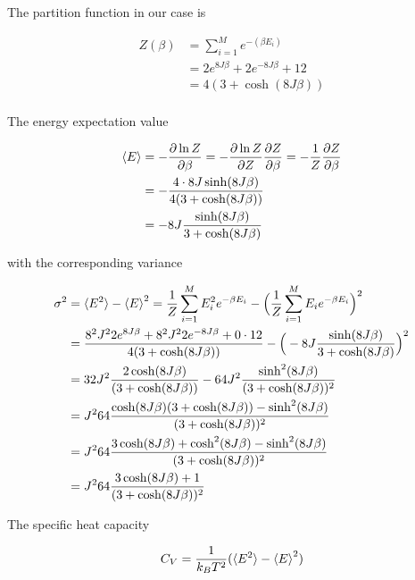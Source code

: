 \documentclass[11pt]{article}
\begin{document}
\begin{flushleft}

The partition function in our case is

\begin{align*}
Z(\beta) &= \sum_{i=1}^M e^{-(\beta E_i)}\\
&= 2 e^{8J \beta} + 2 e^{-8J \beta} + 12\\
&= 4(3 + \cosh (8 J \beta))\\
\end{align*}


The energy expectation value

\begin{align*}
\braket{E} & = - \frac{\partial \ln Z}{\partial \beta}= - \frac{\partial \ln Z}{\partial Z} \frac{\partial Z}{\partial \beta} = - \frac{1}{Z} \frac{\partial Z}{\partial \beta}\\
& = - \frac{4 \cdot 8J \sinh(8J \beta)}{4(3 + \cosh (8 J \beta))}\\
&= - 8J \frac{\sinh(8J \beta)}{3 + \cosh(8J \beta)}  
\end{align*}

with the corresponding variance

\begin{align*}
\sigma^2 &= \braket{E^2} - \braket{E}^2 = \frac{1}{Z} \sum_{i=1}^M E_i^2 e^{- \beta E_i} - \Big(
\frac{1}{Z} \sum_{i=1}^M E_i e^{- \beta E_i} 
\Big)^2\\
 &= \frac{8^2 J^2  2 e^{8J \beta} + 8^2 J^2 2 e^{-8J \beta} + 0 \cdot 12}{ 4(3 + \cosh (8 J \beta))}
- \Big(  - 8J \frac{\sinh(8J \beta)}{3 + \cosh(8J \beta)}  \Big)^2\\
&= 32J^2 \frac{ 2 \cosh (8J \beta)}{ (3 + \cosh (8 J \beta))}
- 64 J^2 \frac{\sinh^2(8J \beta)}{(3 + \cosh(8J \beta))^2}\\
&= J^264 \frac{\cosh (8J \beta)(3 + \cosh (8 J \beta)) - \sinh^2(8J \beta)}{ (3 + \cosh (8 J \beta))^2}\\
&= J^264 \frac{
3\cosh (8J \beta) + \cosh^2 (8 J \beta)
 - \sinh^2(8J \beta)}{ (3 + \cosh (8 J \beta))^2}\\
 &= J^264 \frac{
3\cosh (8J \beta) + 1}{ (3 + \cosh (8 J \beta))^2}\\
\end{align*}

The specific heat capacity 

\begin{equation}
C_V = \frac{1}{k_B T^2} (\braket{E^2} - \braket{E}^2)
\end{equation}


\end{flushleft}
\end{document}
